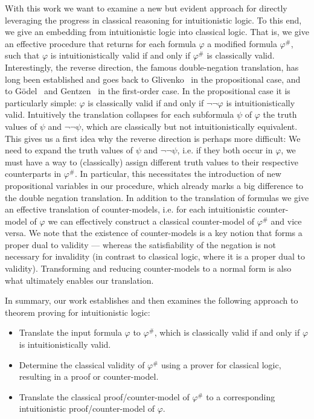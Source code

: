 \documentclass[runningheads]{llncs}
\begin{document}
With this work we want to examine a new but evident approach for directly leveraging the progress in classical reasoning for intuitionistic logic.
To this end, we give an embedding from intuitionistic logic into classical logic. That is, we give an effective procedure that returns for each formula $\varphi$ a modified formula $\varphi^\#$, such that $\varphi$ is intuitionistically valid if and only if $\varphi^\#$ is classically valid.
Interestingly, the reverse direction, the famous double-negation translation, has long been established and goes back to Glivenko~\cite{glivenko1929quelques} in the propositional case, and to G\"odel~\cite{godel1933intuitionistischen} and Gentzen~\cite{gentzen1936widerspruchsfreiheit} in the first-order case. In the propositional case it is particularly simple: $\varphi$ is classically valid if and only if $\neg\neg\varphi$ is intuitionistically valid. Intuitively the translation collapses for each subformula $\psi$ of $\varphi$ the truth values of $\psi$ and $\neg\neg\psi$, which are classically but not intuitionistically equivalent. This gives us a first idea why the reverse direction is perhaps more difficult: We need to expand the truth values of $\psi$ and $\neg\neg\psi$, i.e. if they both occur in $\varphi$, we must have a way to (classically) assign different truth values to their respective counterparts in $\varphi^\#$. In particular, this necessitates the introduction of new propositional variables in our procedure, which already marks a big difference to the double negation translation.
%
In addition to the translation of formulas we give an effective translation of counter-models, i.e. for each intuitionistic counter-model of $\varphi$ we can effectively construct a classical counter-model of $\varphi^\#$ and vice versa.
We note that the existence of counter-models is a key notion that forms a proper dual to validity --- whereas the satisfiability of the negation is not necessary for invalidity (in contrast to classical logic, where it is a proper dual to validity).
Transforming and reducing counter-models to a normal form is also what ultimately enables our translation.

In summary, our work establishes and then examines the following approach to theorem proving for intuitionistic logic:
\begin{itemize}
	\item Translate the input formula $\varphi$ to $\varphi^\#$, which is classically valid if and only if $\varphi$ is intuitionistically valid.
	\item Determine the classical validity of $\varphi^\#$ using a prover for classical logic, resulting in a proof or counter-model.
	\item Translate the classical proof/counter-model of $\varphi^\#$ to a corresponding intuitionistic proof/counter-model of $\varphi$.
\end{itemize}
\end{document}
